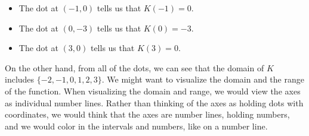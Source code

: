 \documentclass{ximera}
\begin{document}
\begin{itemize}
\item The dot at $(-1,0)$ tells us that $K(-1) = 0$.
\item The dot at $(0,-3)$ tells us that $K(0) = -3$.
\item The dot at $(3,0)$ tells us that $K(3) = 0$.
\end{itemize}


On the other hand, from all of the dots, we can see that the domain of $K$ includes $\{ -2, -1, 0, 1, 2, 3 \}$. We might want to visualize the domain and the range of the function.  When visualizing the domain and range, we would view the axes as individual number lines.  Rather than thinking of the axes as holding dots with coordinates, we would think that the axes are number lines, holding numbers, and we would color in the intervals and numbers, like on a number line.
\end{document}
